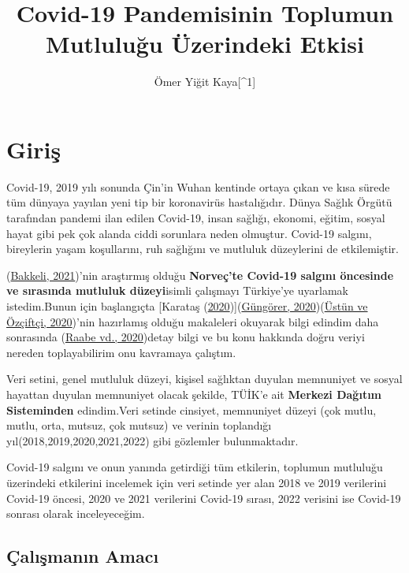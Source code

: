 \documentclass[
  12pt,
]{article}
\title{Covid-19 Pandemisinin Toplumun Mutluluğu Üzerindeki Etkisi}
\author{Ömer Yiğit Kaya{[}\^{}1{]}}
\date{}
\begin{document}
\maketitle

\hypertarget{giriux15f}{%
\section{Giriş}\label{giriux15f}}

Covid-19, 2019 yılı sonunda Çin'in Wuhan kentinde ortaya çıkan ve kısa sürede tüm dünyaya yayılan yeni tip bir koronavirüs hastalığıdır. Dünya Sağlık Örgütü tarafından pandemi ilan edilen Covid-19, insan sağlığı, ekonomi, eğitim, sosyal hayat gibi pek çok alanda ciddi sorunlara neden olmuştur. Covid-19 salgını, bireylerin yaşam koşullarını, ruh sağlığını ve mutluluk düzeylerini de etkilemiştir.

(\protect\hyperlink{ref-bakkeli2021health}{Bakkeli, 2021})'nin araştırmış olduğu \textbf{Norveç'te Covid-19 salgını öncesinde ve sırasında mutluluk düzeyi}isimli çalışmayı Türkiye'ye uyarlamak istedim.Bunun için başlangıçta {[}Karataş (\protect\hyperlink{ref-karatacs2020covid}{2020}){]}(\protect\hyperlink{ref-gungorer2020covid}{Güngörer, 2020})(\protect\hyperlink{ref-ustun2020covid}{Üstün ve Özçiftçi, 2020})'nin hazırlamış olduğu makaleleri okuyarak bilgi edindim daha sonrasında (\protect\hyperlink{ref-raabe2020satisfaction}{Raabe vd., 2020})detay bilgi ve bu konu hakkında doğru veriyi nereden toplayabilirim onu kavramaya çalıştım.

Veri setini, genel mutluluk düzeyi, kişisel sağlıktan duyulan memnuniyet ve sosyal hayattan duyulan memnuniyet olacak şekilde, TÜİK'e ait \textbf{Merkezi Dağıtım Sisteminden} edindim.Veri setinde cinsiyet, memnuniyet düzeyi (çok mutlu, mutlu, orta, mutsuz, çok mutsuz) ve verinin toplandığı yıl(2018,2019,2020,2021,2022) gibi gözlemler bulunmaktadır.

Covid-19 salgını ve onun yanında getirdiği tüm etkilerin, toplumun mutluluğu üzerindeki etkilerini incelemek için veri setinde yer alan 2018 ve 2019 verilerini Covid-19 öncesi, 2020 ve 2021 verilerini Covid-19 sırası, 2022 verisini ise Covid-19 sonrası olarak inceleyeceğim.

\hypertarget{uxe7alux131ux15fmanux131n-amacux131}{%
\subsection{Çalışmanın Amacı}\label{uxe7alux131ux15fmanux131n-amacux131}}
\end{document}
